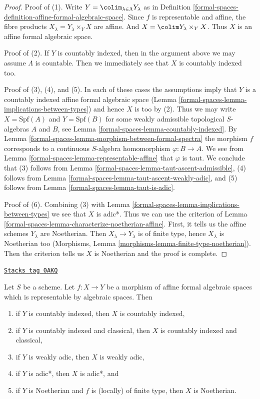 \begin{proof}
Proof of (1). Write $Y = \colim_{\lambda \in \Lambda} Y_\lambda$ as in
Definition \ref{formal-spaces-definition-affine-formal-algebraic-space}.
Since $f$ is representable and affine, the fibre products
$X_\lambda = Y_\lambda \times_Y X$ are affine. And
$X = \colim Y_\lambda \times_Y X$.
Thus $X$ is an affine formal algebraic space.

\medskip\noindent
Proof of (2). If $Y$ is countably indexed, then in the argument above
we may assume $\Lambda$ is countable.
Then we immediately see that $X$ is countably indexed too.

\medskip\noindent
Proof of (3), (4), and (5). In each of these cases the assumptions imply
that $Y$ is a countably indexed affine formal algebraic space
(Lemma \ref{formal-spaces-lemma-implications-between-types})
and hence $X$ is too by (2). Thus we may write $X = \text{Spf}(A)$
and $Y = \text{Spf}(B)$ for some weakly admissible topological
$S$-algebras $A$ and $B$, see Lemma \ref{formal-spaces-lemma-countably-indexed}.
By Lemma \ref{formal-spaces-lemma-morphism-between-formal-spectra}
the morphism $f$ corresponds to a continuous $S$-algebra
homomorphism $\varphi : B \to A$. We see from
Lemma \ref{formal-spaces-lemma-representable-affine} that $\varphi$ is taut. We conclude that
(3) follows from Lemma \ref{formal-spaces-lemma-taut-ascent-admissible},
(4) follows from Lemma \ref{formal-spaces-lemma-taut-ascent-weakly-adic}, and
(5) follows from Lemma \ref{formal-spaces-lemma-taut-is-adic}.

\medskip\noindent
Proof of (6). Combining (3) with Lemma \ref{formal-spaces-lemma-implications-between-types}
we see that $X$ is adic*. Thus we can use the criterion of
Lemma \ref{formal-spaces-lemma-characterize-noetherian-affine}.
First, it tells us the affine schemes $Y_\lambda$ are Noetherian.
Then $X_\lambda \to Y_\lambda$ is of finite type, hence $X_\lambda$
is Noetherian too (Morphisms, Lemma
\ref{morphisms-lemma-finite-type-noetherian}).
Then the criterion tells us $X$ is Noetherian and the proof is
complete.
\end{proof}

\begin{lemma}
\label{formal-spaces-lemma-property-goes-up-affine}
\href{https://stacks.math.columbia.edu/tag/0AKQ}{\texttt{Stacks tag 0AKQ}}

Let $S$ be a scheme. Let $f : X \to Y$ be a morphism of affine formal
algebraic spaces which is representable by algebraic spaces. Then
\begin{enumerate}
\item if $Y$ is countably indexed, then $X$ is countably indexed,
\item if $Y$ is countably indexed and classical, then $X$ is countably
indexed and classical,
\item if $Y$ is weakly adic, then $X$ is weakly adic,
\item if $Y$ is adic*, then $X$ is adic*, and
\item if $Y$ is Noetherian and $f$ is (locally) of finite type, then
$X$ is Noetherian.
\end{enumerate}
\end{lemma}

